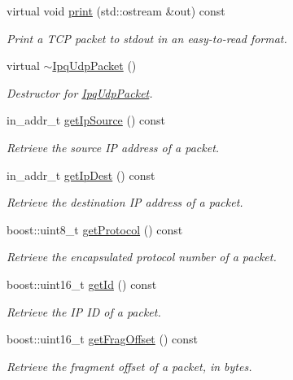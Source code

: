 \begin{DoxyCompactItemize}
virtual void \hyperlink{classIPQ_1_1IpqUdpPacket_ad64646eb338bad97b6c593ad5225d36d}{print} (std\-::ostream \&out) const 
\begin{DoxyCompactList}\small\item\em \-Print a \-T\-C\-P packet to stdout in an easy-\/to-\/read format. \end{DoxyCompactList}\item 
virtual \hyperlink{classIPQ_1_1IpqUdpPacket_a8d59e6f50fc02dd78b97ab321de65de1}{$\sim$\-Ipq\-Udp\-Packet} ()
\begin{DoxyCompactList}\small\item\em \-Destructor for \hyperlink{classIPQ_1_1IpqUdpPacket}{\-Ipq\-Udp\-Packet}. \end{DoxyCompactList}\item 
in\-\_\-addr\-\_\-t \hyperlink{classIPQ_1_1IpqIpPacket_a4708c5a987eb9796566e2b3bdd072589}{get\-Ip\-Source} () const 
\begin{DoxyCompactList}\small\item\em \-Retrieve the source \-I\-P address of a packet. \end{DoxyCompactList}\item 
in\-\_\-addr\-\_\-t \hyperlink{classIPQ_1_1IpqIpPacket_a056bedcbf7998452d147f2d2ef68b611}{get\-Ip\-Dest} () const 
\begin{DoxyCompactList}\small\item\em \-Retrieve the destination \-I\-P address of a packet. \end{DoxyCompactList}\item 
boost\-::uint8\-\_\-t \hyperlink{classIPQ_1_1IpqIpPacket_aefa78bb7a89a337bb0c1d88c02d6d5cd}{get\-Protocol} () const 
\begin{DoxyCompactList}\small\item\em \-Retrieve the encapsulated protocol number of a packet. \end{DoxyCompactList}\item 
boost\-::uint16\-\_\-t \hyperlink{classIPQ_1_1IpqIpPacket_a937be4034dafdce171b7e90ae14f09d4}{get\-Id} () const 
\begin{DoxyCompactList}\small\item\em \-Retrieve the \-I\-P \-I\-D of a packet. \end{DoxyCompactList}\item 
boost\-::uint16\-\_\-t \hyperlink{classIPQ_1_1IpqIpPacket_a97e6e13ede2c6c6f028ee0eb1130600b}{get\-Frag\-Offset} () const 
\begin{DoxyCompactList}\small\item\em \-Retrieve the fragment offset of a packet, in bytes. \end{DoxyCompactList}\item 

\end{DoxyCompactItemize}
